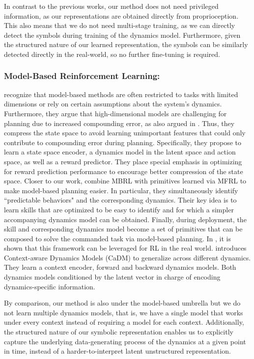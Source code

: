\documentclass[Afour,sageh,times]{sagej}
\theoremstyle{lemma}
\begin{document}
In contrast to the previous works, our method does not need privileged information, as our representations are obtained directly from proprioception. This also means that we do not need multi-stage training, as we can directly detect the symbols during training of the dynamics model. Furthermore, given the structured nature of our learned representation, the symbols can be similarly detected directly in the real-world, so no further fine-tuning is required.

\subsubsection{Model-Based Reinforcement Learning:} 

\cite{havens2019learning} recognize that model-based methods are often restricted to tasks with limited dimensions or rely on certain assumptions about the system's dynamics. Furthermore, they argue that high-dimensional models are challenging for planning due to increased compounding error, as also argued in \cite[]{stachowicz2024racer, talvitie2014model, talvitie2017self}. Thus, they compress the state space to avoid learning unimportant features that could only contribute to compounding error during planning. Specifically, they propose to learn a state space encoder, a dynamics model in the latent space and action space, as well as a reward predictor. They place special emphasis in optimizing for reward prediction performance to encourage better compression of the state space. Closer to our work, \cite{sharma2019dynamics} combine MBRL with primitives learned via MFRL to make model-based planning easier. In particular, they simultaneously identify ``predictable behaviors" and the corresponding dynamics. Their key idea is to learn skills that are optimized to be easy to identify and for which a simpler accompanying dynamics model can be obtained. Finally, during deployment, the skill and corresponding dynamics model become a set of primitives that can be composed to solve the commanded task via model-based planning. In \cite{sharma2020emergent}, it is shown that this framework can be leveraged for RL in the real world. \cite{lee2020context} introduces Context-aware Dynamics Models (CaDM) to generalize across different dynamics. They learn a context encoder, forward and backward dynamics models. Both dynamics models conditioned by the latent vector in charge of encoding dynamics-specific information.

By comparison, our method is also under the model-based umbrella but we do not learn multiple dynamics models, that is, we have a single model that works under every context instead of requiring a model for each context. Additionally, the structured nature of our symbolic representation enables us to explicitly capture the underlying data-generating process of the dynamics at a given point in time, instead of a harder-to-interpret latent unstructured representation.
\end{document}
